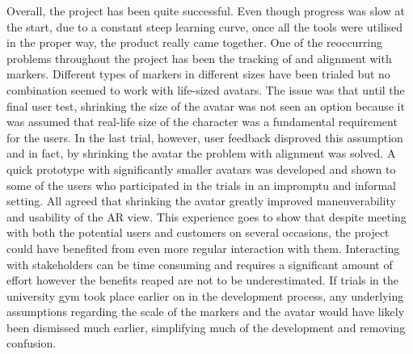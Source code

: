 \documentclass{l4proj}
\begin{document}
Overall, the project has been quite successful. Even though progress was slow at the start, due to a constant steep learning curve, once all the tools were utilised in the proper way, the product really came together. One of the reoccurring problems throughout the project has been the tracking of and alignment with markers. Different types of markers in different sizes have been trialed but no combination seemed to work with life-sized avatars. The issue was that until the final user test, shrinking the size of the avatar was not seen an option because it was assumed that real-life size of the character was a fundamental requirement for the users. In the last trial, however, user feedback disproved this assumption and in fact, by shrinking the avatar the problem with alignment was solved. A quick prototype with significantly smaller avatars was developed and shown to some of the users who participated in the trials in an impromptu and informal setting. All agreed that shrinking the avatar greatly improved maneuverability and usability of the AR view. This experience goes to show that despite meeting with both the potential users and customers on several occasions, the project could have benefited from even more regular interaction with them. Interacting with stakeholders can be time consuming and requires a significant amount of effort however the benefits reaped are not to be underestimated. If trials in the university gym took place earlier on in the development process, any underlying assumptions regarding the scale of the markers and the avatar would have likely been dismissed much earlier, simplifying much of the development and removing confusion.
\end{document}
